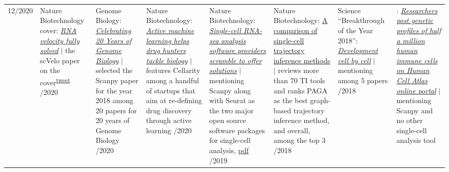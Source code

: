 \vspace{-.5em}
\begin{longtable}[t]{R{\widthC} p{\widthB}}
12/2020
& Nature Biotechnology cover: \href{https://www.nature.com/nbt/volumes/38/issues/12}{\textit{RNA velocity fully solved}} {\footnotesize$\vert$ the scVelo paper on the cover\textsuperscript{\href{https://twitter.com/slinnarsson/status/1334739560576798722}{tweet}}}
/2020
& Genome Biology: \href{https://genomebiology.biomedcentral.com/20years}{\textit{Celebrating 20 Years of Genome Biology}} {\footnotesize$\vert$ selected the Scanpy paper for the year 2018 among 20 papers  for 20 years of Genome Biology}
/2020
& Nature Biotechnology: \href{https://www.nature.com/articles/s41587-020-0521-4}{\textit{Active machine learning helps drug hunters tackle biology}} {\footnotesize$\vert$ features Cellarity among a handful of startups that aim at re-defining drug discovery through active learning}
/2020
& Nature Biotechnology: \href{https://www.nature.com/articles/s41587-020-0449-8}{\textit{Single-cell RNA-seq analysis software providers scramble to offer solutions}} {\footnotesize$\vert$ mentioning Scanpy along with Seurat as the two major open source software packages for single-cell analysis, \href{https://rdcu.be/b2M5l}{pdf}}
/2019
& Nature Biotechnology: \href{https://www.nature.com/articles/s41587-019-0071-9}{A comparison of single-cell trajectory inference methods} {\footnotesize$\vert$ reviews more than 70 TI tools and ranks PAGA as the best graph-based trajectory inference method, and overall, among the top 3}
/2018
& Science ``Breakthrough of the Year 2018'': \href{https://vis.sciencemag.org/breakthrough2018/finalists/#cell-development}{\textit{Development cell by cell}} {\footnotesize$\vert$ mentioning among 5 papers}
/2018
& : \href{https://www.broadinstitute.org/news/researchers-post-genetic-profiles-half-million-human-immune-cells-human-cell-atlas-online}{\textit{Researchers post genetic profiles of half a million human immune cells on Human Cell Atlas online portal}} {\footnotesize$\vert$ mentioning Scanpy and no other single-cell analysis tool}
\newline

\end{longtable}
